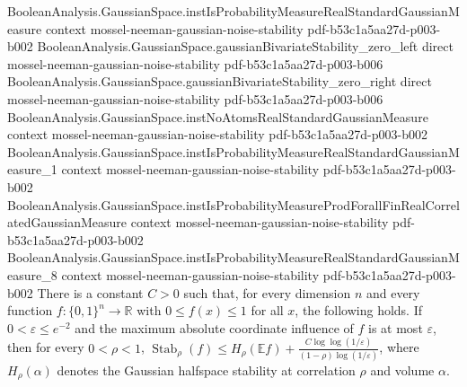 \begin{theorem}
\proofstep
  {BooleanAnalysis.GaussianSpace.instIsProbabilityMeasureRealStandardGaussianMeasure}
  {context}
  {mossel-neeman-gaussian-noise-stability}
  {pdf-b53c1a5aa27d-p003-b002}
\proofstep
  {BooleanAnalysis.GaussianSpace.gaussianBivariateStability_zero_left}
  {direct}
  {mossel-neeman-gaussian-noise-stability}
  {pdf-b53c1a5aa27d-p003-b006}
\proofstep
  {BooleanAnalysis.GaussianSpace.gaussianBivariateStability_zero_right}
  {direct}
  {mossel-neeman-gaussian-noise-stability}
  {pdf-b53c1a5aa27d-p003-b006}
\proofstep
  {BooleanAnalysis.GaussianSpace.instNoAtomsRealStandardGaussianMeasure}
  {context}
  {mossel-neeman-gaussian-noise-stability}
  {pdf-b53c1a5aa27d-p003-b002}
\proofstep
  {BooleanAnalysis.GaussianSpace.instIsProbabilityMeasureRealStandardGaussianMeasure_1}
  {context}
  {mossel-neeman-gaussian-noise-stability}
  {pdf-b53c1a5aa27d-p003-b002}
\proofstep
  {BooleanAnalysis.GaussianSpace.instIsProbabilityMeasureProdForallFinRealCorrelatedGaussianMeasure}
  {context}
  {mossel-neeman-gaussian-noise-stability}
  {pdf-b53c1a5aa27d-p003-b002}
\proofstep
  {BooleanAnalysis.GaussianSpace.instIsProbabilityMeasureRealStandardGaussianMeasure_8}
  {context}
  {mossel-neeman-gaussian-noise-stability}
  {pdf-b53c1a5aa27d-p003-b002}
There is a constant $C>0$ such that, for every dimension $n$ and every function
$f:\{0,1\}^n\to\mathbb R$ with $0\le f(x)\le1$ for all $x$, the following holds. If
$0<\varepsilon\le e^{-2}$ and the maximum absolute coordinate influence of $f$ is at
most $\varepsilon$, then for every $0<\rho<1$, $\operatorname{Stab}_\rho(f)\le
H_\rho(\mathbb E f)+\frac{C\log\log(1/\varepsilon)}{(1-\rho)\log(1/\varepsilon)}$, where
$H_\rho(\alpha)$ denotes the Gaussian halfspace stability at correlation $\rho$ and
volume $\alpha$.
\end{theorem}
